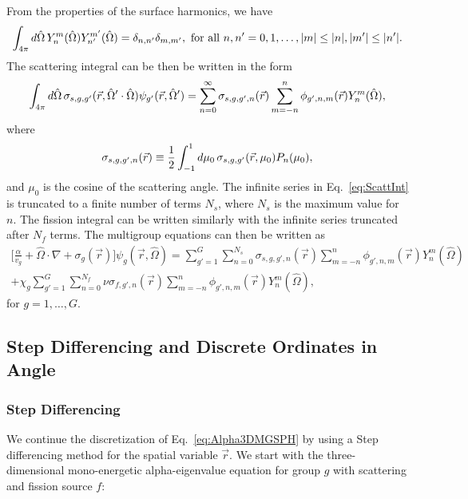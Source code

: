From the properties of the surface harmonics, we have
\begin{equation}
	\int_{4\pi} \mathop{}\!d \hat{\Omega} \, Y_{n}^{m}(\hat{\Omega}) Y_{n'}^{m'}(\hat{\Omega}) = \delta_{n,n'} \delta_{m,m'}, \text{ for all } n, n' = 0, 1, \dots, \lvert m\rvert \leq \lvert n\rvert, \lvert m'\rvert \leq \lvert n'\rvert.
\end{equation}
The scattering integral can be then be written in the form
\begin{equation}
	\int_{4\pi} \mathop{}\!d \hat{\Omega} \, \sigma_{s,g,g'}(\vec{r},\hat{\Omega}' \cdot \hat{\Omega}) \psi_{g'}(\vec{r},\hat{\Omega}') = \sum_{n=0}^{\infty} \sigma_{s,g,g',n}(\vec{r}) \sum_{m=-n}^{n} \phi_{g',n,m}(\vec{r})Y_{n}^{m}(\hat{\Omega}),
	\label{eq:ScattInt}
\end{equation}
where
\begin{equation}
	\sigma_{s,g,g',n}(\vec{r}) \equiv \frac{1}{2} \int_{-1}^{1} \mathop{}\!d \mu_{0} \, \sigma_{s,g,g'}(\vec{r},\mu_{0}) P_{n}(\mu_{0}),
\end{equation}
and $\mu_{0}$ is the cosine of the scattering angle. The infinite series in Eq.~\ref{eq:ScattInt} is truncated to a finite number of terms $N_{s}$, where $N_{s}$ is the maximum value for $n$. The fission integral can be written similarly with the infinite series truncated after $N_{f}$ terms. The multigroup equations can then be written as
\begin{multline}
	\bigg [ \frac{\alpha}{v_{g}} + \hat{\Omega} \cdot \nabla + \sigma_{g}(\vec{r}) \bigg ] \psi_{g}(\vec{r},\hat{\Omega}) = \sum_{g'=1}^{G} \sum_{n=0}^{N_{s}} \sigma_{s,g,g',n}(\vec{r}) \sum_{m=-n}^{n} \phi_{g',n,m}(\vec{r}) Y_{n}^{m}(\hat{\Omega}) \\ + \chi_{g} \sum_{g'=1}^{G} \sum_{n=0}^{N_{f}} \nu\sigma_{f,g',n}(\vec{r}) \sum_{m=-n}^{n} \phi_{g',n,m}(\vec{r}) Y_{n}^{m}(\hat{\Omega}), 
	\label{eq:Alpha3DMGSPH}
\end{multline}
for $g = 1, \dots, G$.

\subsection{Step Differencing and Discrete Ordinates in Angle}

\subsubsection{Step Differencing}

We continue the discretization of Eq.~\ref{eq:Alpha3DMGSPH} by using a Step differencing method \cite{lewis_computational_1984} for the spatial variable $\vec{r}$. We start with the three-dimensional mono-energetic alpha-eigenvalue equation for group $g$ with scattering and fission source $f$:

